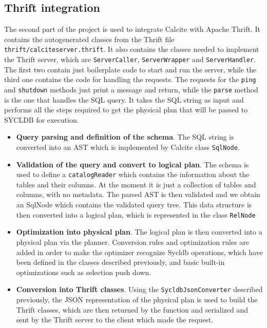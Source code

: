 \documentclass[a4paper, 10pt]{article}
\begin{document}
\subsection{Thrift integration}

The second part of the project is used to integrate Calcite with Apache Thrift. It contains the autogenerated classes from the Thrift file \texttt{thrift/calciteserver.thrift}. It also contains the classes needed to implement the Thrift server, which are \texttt{ServerCaller}, \texttt{ServerWrapper} and \texttt{ServerHandler}. The first two contain just boilerplate code to start and run the server, while the third one contains the code for handling the requests. The requests for the \texttt{ping} and \texttt{shutdown} methods just print a message and return, while the \texttt{parse} method is the one that handles the SQL query. It takes the SQL string as input and performs all the steps required to get the physical plan that will be passed to SYCLDB for execution.
\begin{itemize}
    \item \textbf{Query parsing and definition of the schema}. The SQL string is converted into an AST which is implemented by Calcite class \texttt{SqlNode}.
    \item \textbf{Validation of the query and convert to logical plan}. The schema is used to define a \texttt{catalogReader} which contains the information about the tables and their columns. At the moment it is just a collection of tables and columns, with no metadata. The parsed AST is then validated and we obtain an SqlNode which contains the validated query tree. This data structure is then converted into a logical plan, which is represented in the class \texttt{RelNode}
    \item \textbf{Optimization into physical plan}. The logical plan is then converted into a physical plan via the planner. Conversion rules and optimization rules are added in order to make the optimizer recognize Sycldb operations, which have been defined in the classes described previously, and basic built-in optimizations such as selection push down.
    \item \textbf{Conversion into Thrift classes}. Using the \texttt{SycldbJsonConverter} described previously, the JSON representation of the physical plan is used to build the Thrift classes, which are then returned by the function and serialized and sent by the Thrift server to the client which made the request.
\end{itemize}
\end{document}

